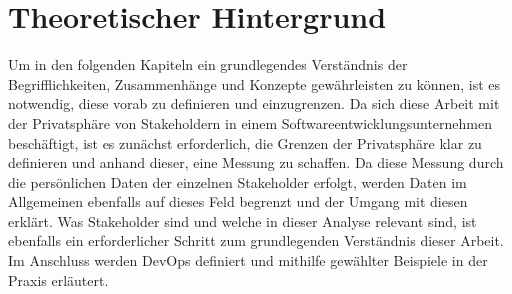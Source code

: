 \chapter{Theoretischer Hintergrund} %
\label{Background} %
Um in den folgenden Kapiteln ein grundlegendes Verständnis der Begrifflichkeiten, Zusammenhänge und Konzepte gewährleisten zu können, ist es notwendig,
diese vorab zu definieren und einzugrenzen. Da sich diese Arbeit mit der Privatsphäre von Stakeholdern in einem Softwareentwicklungsunternehmen beschäftigt,
ist es zunächst erforderlich, die Grenzen der Privatsphäre klar zu definieren und anhand dieser, eine Messung zu schaffen. Da diese Messung durch die persönlichen Daten
der einzelnen Stakeholder erfolgt, werden Daten im Allgemeinen ebenfalls auf dieses Feld begrenzt und der Umgang mit diesen erklärt. Was Stakeholder sind und welche in dieser Analyse
relevant sind, ist ebenfalls ein erforderlicher Schritt zum grundlegenden Verständnis dieser Arbeit. Im Anschluss werden DevOps definiert und mithilfe gewählter Beispiele in der Praxis erläutert.

